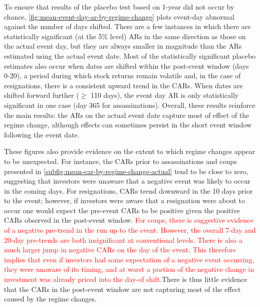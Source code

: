 \documentclass[12pt,final,fleqn]{article}
\theoremstyle{plain}
\begin{document}
To ensure that results of the placebo test based on 1-year did not occur by chance, \autoref{fig:mean-event-day-ar-by-regime-change} plots event-day abnormal against the number of days shifted. There are a few instances in which there are statistically significant (at the 5\% level) ARs in the same direction as those on the actual event day, but they are always smaller in magnitude than the ARs estimated using the actual event date. Most of the statistically significant placebo estimates also occur when dates are shifted within the post-event window (days 0-20), a period during which stock returns remain volatile and, in the case of resignations, there is a consistent upward trend in the CARs. When dates are shifted forward further ($\geq$ 110 days), the event day AR is only statistically significant in one case (day 365 for assassinations). Overall, these results reinforce the main results: the ARs on the actual event date capture most of effect of the regime change, although effects can sometimes persist in the short event window following the event date. 

These figures also provide evidence on the extent to which regime changes appear to be unexpected. For instance, the CARs prior to assassinations and coups presented in \autoref{subfig:mean-car-by-regime-change-actual} tend to be close to zero, suggesting that investors were unaware that a negative event was likely to occur in the coming days. For resignations, CARs trend downward in the 10 days prior to the event; however, if investors were aware that a resignation were about to occur one would expect the pre-event CARs to be positive given the positive CARs observed in the post-event window. \textcolor{red}{For coups, there is suggestive evidence of a negative pre-trend in the run up to the event. However, the overall 7-day and 20-day pre-trends are both insignificant at conventional levels. There is also a much larger jump in negative CARs on the day of the event. This therefore implies that even if investors had some expectation of a negative event occurring, they were unaware of its timing, and at worst a portion of the negative change in investment was already priced into the day-of shift.}There is thus little evidence that the CARs in the post-event window are not capturing most of the effect caused by the regime changes.
\end{document}
